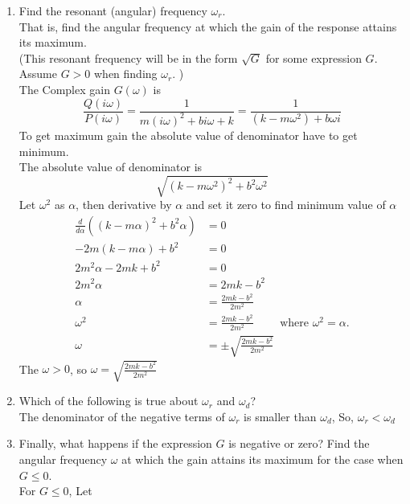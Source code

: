 \begin{enumerate}
\item Find the resonant (angular) frequency $\omega_ r$.\\
  That is, find the angular frequency at which the gain of the response attains its maximum. \\
  (This resonant frequency will be in the form $\sqrt{G}$
  for some expression $G$. Assume $G>0$ when finding $\omega _r$. )\\
  The Complex gain $G(\omega)$ is
  \begin{equation*}
    \frac{Q(i \omega)}{P(i \omega)}
    = \frac{1}{m (i \omega)^2 + b i \omega + k}
    = \frac{1}{(k - m \omega ^2) + b \omega i}
  \end{equation*}
  To get maximum gain the absolute value of denominator have to get minimum. \\
  The absolute value of denominator is
  \begin{equation*}
    \sqrt{(k - m \omega ^2)^2 + b^2 \omega^2}
  \end{equation*}
  Let $\omega ^2$ as $\alpha$, then derivative by $\alpha$ and set it zero to find minimum value of $\alpha$
  \begin{align*}
    \frac{d}{d \alpha} \left( (k - m \alpha)^2 + b^2 \alpha \right) &= 0 \\
    -2m(k - m \alpha) + b^2 &= 0 \\
    2m^2 \alpha - 2mk + b^2 &= 0 \\
    2m^2 \alpha &= 2mk - b^2\\
    \alpha &= \frac{2mk - b^2}{2m^2} \\
    \omega ^2 &= \frac{2mk - b^2}{2m^2} \qquad \text{ where } \omega ^2 = \alpha. \\
    \omega &= \pm \sqrt{\frac{2mk - b^2}{2m^2}}
  \end{align*}
  The $\omega > 0$, so $\omega = \sqrt{\frac{2mk - b^2}{2m^2}}$

\item Which of the following is true about $\omega_ r$ and $\omega_ d$?\\

  The denominator of the negative terms of $\omega _r$ is smaller than $\omega _d$,
  So, $\omega _ r < \omega _ d$

\item Finally, what happens if the expression $G$ is negative or zero?
  Find the angular frequency $\omega$ at which the gain attains
  its maximum for the case when $G≤0$.\\

  For $G≤0$,
  Let 

\end{enumerate}



\clearpage

